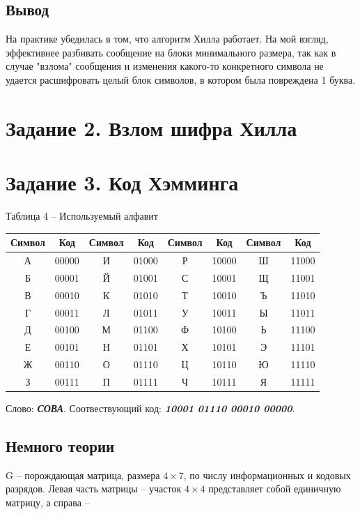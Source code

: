 \documentclass[a5paper, 10pt]{article}
\theoremstyle{definition}
\theoremstyle{plain}
\theoremstyle{remark}
\begin{document}
\subsection{Вывод}
На практике убедилась в том, что алгоритм Хилла работает. На мой взгляд, эффективнее разбивать сообщение на блоки минимального размера, так как в случае "взлома" сообщения и изменения какого-то конкретного символа не удается расшифровать целый блок символов, в котором была повреждена 1 буква.

\section{Задание 2. Взлом шифра Хилла}	


\section{Задание 3. Код Хэмминга}
\begin{center}
Таблица 4 -- Используемый алфавит\\
\begin{tabular}{ |c|c|c|c|c|c|c|c| } 
 \hline
Символ & Код & Символ & Код & Символ & Код & Символ & Код\\
\hline
А & 00000 & И  & 01000 & Р  & 10000  & Ш  & 11000 \\
 \hline
Б & 00001 & Й  & 01001 & С  & 10001  & Щ  & 11001 \\
 \hline
В & 00010 & К  & 01010 & Т  & 10010  & Ъ  & 11010 \\
 \hline
Г & 00011 & Л  & 01011 & У  & 10011  & Ы  & 11011 \\
 \hline
Д & 00100 & М  & 01100 & Ф  & 10100  & Ь  & 11100 \\
 \hline
Е & 00101 & Н & 01101 & Х  & 10101  & Э  & 11101 \\
 \hline
Ж & 00110 & О  & 01110 & Ц  & 10110  & Ю  & 11110 \\
 \hline
З & 00111 & П & 01111 & Ч  & 10111  & Я  & 11111 \\
 \hline
\end{tabular}
\end{center}

Слово: \textbf{\textit{СОВА}}.
Соотвествующий код: \textbf{\textit{10001 01110 00010 00000}}.

\subsection{Немного теории}
G -- порождающая матрица, размера $4 \times 7$, по числу информационных и кодовых разрядов. Левая часть матрицы -- участок  $4 \times 4$ представляет собой единичную матрицу, а справа -- \\
\end{document}
